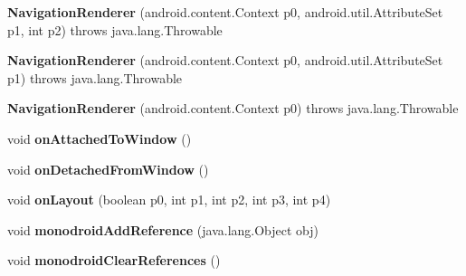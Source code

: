 \begin{DoxyCompactItemize}
\item 
\mbox{\label{classmd5b60ffeb829f638581ab2bb9b1a7f4f3f_1_1_navigation_renderer_a4fd75f7ccc53756baaf34338ee29fa5c}} 
{\bfseries Navigation\+Renderer} (android.\+content.\+Context p0, android.\+util.\+Attribute\+Set p1, int p2)  throws java.\+lang.\+Throwable 	
\item 
\mbox{\label{classmd5b60ffeb829f638581ab2bb9b1a7f4f3f_1_1_navigation_renderer_ae79f4d9083161297dbede7b341873a6c}} 
{\bfseries Navigation\+Renderer} (android.\+content.\+Context p0, android.\+util.\+Attribute\+Set p1)  throws java.\+lang.\+Throwable 	
\item 
\mbox{\label{classmd5b60ffeb829f638581ab2bb9b1a7f4f3f_1_1_navigation_renderer_af6814c5338c0aaf0027c562d0344ddca}} 
{\bfseries Navigation\+Renderer} (android.\+content.\+Context p0)  throws java.\+lang.\+Throwable 	
\item 
\mbox{\label{classmd5b60ffeb829f638581ab2bb9b1a7f4f3f_1_1_navigation_renderer_a25d8c1e5ebe75b28d52ae09ac7bed4f6}} 
void {\bfseries on\+Attached\+To\+Window} ()
\item 
\mbox{\label{classmd5b60ffeb829f638581ab2bb9b1a7f4f3f_1_1_navigation_renderer_ac900a338e48e325dcc118a47937429c9}} 
void {\bfseries on\+Detached\+From\+Window} ()
\item 
\mbox{\label{classmd5b60ffeb829f638581ab2bb9b1a7f4f3f_1_1_navigation_renderer_a7a117ff161f3a6f2d44642c32fba1306}} 
void {\bfseries on\+Layout} (boolean p0, int p1, int p2, int p3, int p4)
\item 
\mbox{\label{classmd5b60ffeb829f638581ab2bb9b1a7f4f3f_1_1_navigation_renderer_a081007f83180dc47c8fc1b19a1b14c29}} 
void {\bfseries monodroid\+Add\+Reference} (java.\+lang.\+Object obj)
\item 
\mbox{\label{classmd5b60ffeb829f638581ab2bb9b1a7f4f3f_1_1_navigation_renderer_a475bdc366c4f2909604d6e217dba8235}} 
void {\bfseries monodroid\+Clear\+References} ()
\end{DoxyCompactItemize}
